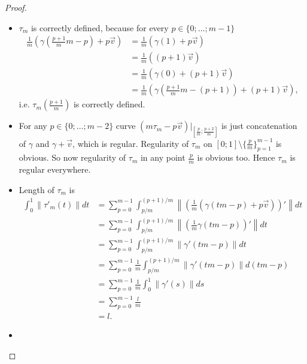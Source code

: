 \documentclass[12pt,a4paper]{article}
\begin{document}
\begin{problem}{72}
        \begin{proof}
            \begin{itemize}
                \item $\tau_m$ is correctly defined, because for every $p \in \{0; \dots; m-1\}$
                    \begin{align*}
                        \frac{1}{m}\left(\gamma\left(\frac{p+1}{m}m - p\right) + p\vec{v}\right)
                        &= \frac{1}{m}(\gamma(1) + p\vec{v})\\
                        &= \frac{1}{m}((p+1)\vec{v})\\
                        &= \frac{1}{m}(\gamma(0) + (p+1)\vec{v})\\
                        &= \frac{1}{m}\left(\gamma\left(\frac{p+1}{m}m - (p+1)\right) + (p+1)\vec{v}\right),
                    \end{align*}
                    i.e. $\tau_m(\frac{p+1}{m})$ is correctly defined.
                \item For any $p \in \{0; \dots; m-2\}$ curve $(m\tau_m - p\vec{v})|_{[\frac{p}{m}; \frac{p+2}{m}]}$ is just concatenation of $\gamma$ and $\gamma + \vec{v}$, which is regular. Regularity of $\tau_m$ on $[0; 1] \setminus \{\frac{p}{m}\}_{p=1}^{m-1}$ is obvious. So now regularity of $\tau_m$ in any point $\frac{p}{m}$ is obvious too. Hence $\tau_m$ is regular everywhere.
                \item Length of $\tau_m$ is
                    \begin{align*}
                        \int_0^1 \|\tau'_m(t)\| dt
                        &= \sum_{p=0}^{m-1} \int_{p/m}^{(p+1)/m} \left\|\left(\frac{1}{m}(\gamma(tm - p) + p\vec{v})\right)'\right\| dt\\
                        &= \sum_{p=0}^{m-1} \int_{p/m}^{(p+1)/m} \left\|\left(\frac{1}{m}\gamma(tm - p)\right)'\right\| dt\\
                        &= \sum_{p=0}^{m-1} \int_{p/m}^{(p+1)/m} \|\gamma'(tm - p)\| dt\\
                        &= \sum_{p=0}^{m-1} \frac{1}{m} \int_{p/m}^{(p+1)/m} \|\gamma'(tm - p)\| d(tm - p)\\
                        &= \sum_{p=0}^{m-1} \frac{1}{m} \int_0^1 \|\gamma'(s)\| ds\\
                        &= \sum_{p=0}^{m-1} \frac{l}{m}\\
                        &= l.
                    \end{align*}
                \item

\end{itemize}
\end{proof}
\end{problem}
\end{document}

